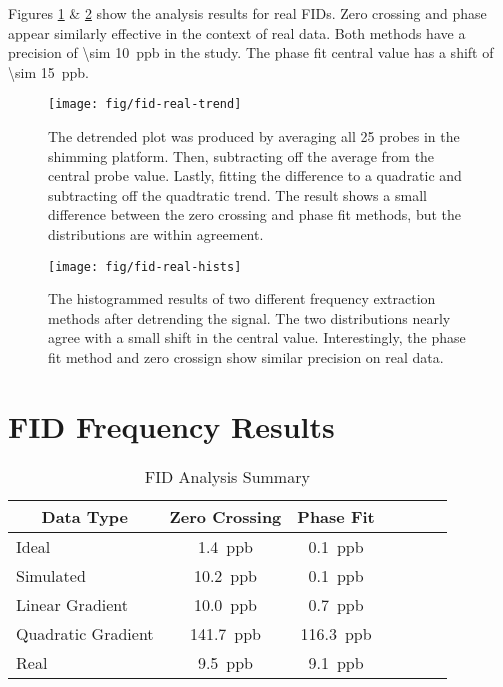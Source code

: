 Figures \ref{fig:fid-real-trend} \& \ref{fig:fid-real-hists} show the analysis results for real FIDs.  Zero crossing and phase appear similarly effective in the context of real data.  Both methods have a precision of \SI{\sim 10}{ppb} in the study.  The phase fit central value has a shift of \SI{\sim 15}{ppb}.

\begin{figure}
\label{fig:fid-real-trend}
\centering
\texttt{[image: fig/fid-real-trend]}
\caption{The detrended plot was produced by averaging all 25 probes in the shimming platform.  Then, subtracting off the average from the central probe value.  Lastly, fitting the difference to a quadratic and subtracting off the quadtratic trend.  The result shows a small difference between the zero crossing and phase fit methods, but the distributions are within agreement.}
\end{figure}

\begin{figure}
\label{fig:fid-real-hists}
\centering
\texttt{[image: fig/fid-real-hists]}
\caption{The histogrammed results of two different frequency extraction methods after detrending the signal.  The two distributions nearly agree with a small shift in the central value.  Interestingly, the phase fit method and zero crossign show similar precision on real data.}
\end{figure}

\section{FID Frequency Results}

\begin{table}[h]
\label{tab:fid-analysis-summary}
\caption{FID Analysis Summary}
\centering
\begin{tabular}{l c c c c c c}
    \hline
    \multicolumn{1}{c}{Data Type} & Zero Crossing & Phase Fit \\
    \hline
    Ideal                & \SI{1.4}{ppb} & \SI{0.1}{ppb} \\
    Simulated            & \SI{10.2}{ppb} & \SI{0.1}{ppb} \\
    Linear Gradient      & \SI{10.0}{ppb} & \SI{0.7}{ppb} \\
    Quadratic Gradient   & \SI{141.7}{ppb} & \SI{116.3}{ppb} \\
    Real                 & \SI{9.5}{ppb} & \SI{9.1}{ppb} \\
    \hline
\end{tabular}
\end{table}
